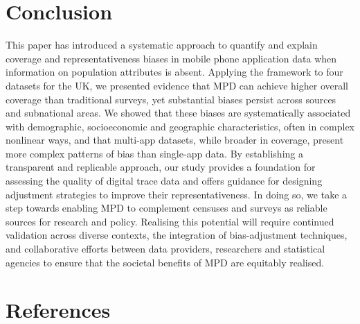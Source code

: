 \documentclass{article}
\begin{document}
\section{Conclusion}\label{conclusion}

This paper has introduced a systematic approach to quantify and explain
coverage and representativeness biases in mobile phone application data
when information on population attributes is absent. Applying the
framework to four datasets for the UK, we presented evidence that MPD
can achieve higher overall coverage than traditional surveys, yet
substantial biases persist across sources and subnational areas. We
showed that these biases are systematically associated with demographic,
socioeconomic and geographic characteristics, often in complex nonlinear
ways, and that multi-app datasets, while broader in coverage, present
more complex patterns of bias than single-app data. By establishing a
transparent and replicable approach, our study provides a foundation for
assessing the quality of digital trace data and offers guidance for
designing adjustment strategies to improve their representativeness. In
doing so, we take a step towards enabling MPD to complement censuses and
surveys as reliable sources for research and policy. Realising this
potential will require continued validation across diverse contexts, the
integration of bias-adjustment techniques, and collaborative efforts
between data providers, researchers and statistical agencies to ensure
that the societal benefits of MPD are equitably realised.

\section*{References}\label{references}
\end{document}

